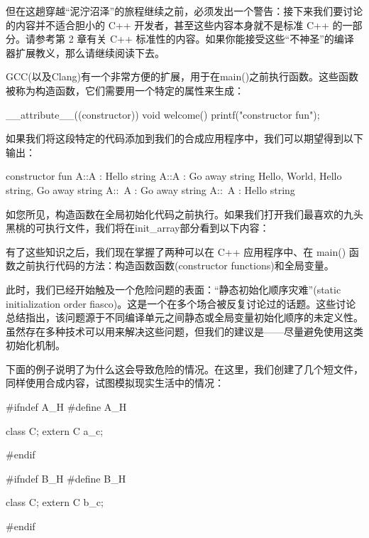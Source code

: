 但在这趟穿越“泥泞沼泽”的旅程继续之前，必须发出一个警告：接下来我们要讨论的内容并不适合胆小的 C++ 开发者，甚至这些内容本身就不是标准 C++ 的一部分。请参考第 2 章有关 C++ 标准性的内容。如果你能接受这些“不神圣”的编译器扩展教义，那么请继续阅读下去。

GCC(以及Clang)有一个非常方便的扩展，用于在main()之前执行函数。这些函数被称为构造函数，它们需要用一个特定的属性来生成：

\begin{cpp}
__attribute__((constructor)) void welcome() {
printf("constructor fun\n");
}
\end{cpp}

如果我们将这段特定的代码添加到我们的合成应用程序中，我们可以期望得到以下输出：

\begin{shell}
constructor fun
A::A : Hello string
A::A : Go away string
Hello, World, Hello string, Go away string
A::~A : Go away string
A::~A : Hello string
\end{shell}

如您所见，构造函数在全局初始化代码之前执行。如果我们打开我们最喜欢的九头黑桃的可执行文件，我们将在init\_array部分看到以下内容：


有了这些知识之后，我们现在掌握了两种可以在 C++ 应用程序中、在 main() 函数之前执行代码的方法：构造函数函数(constructor functions)和全局变量。

此时，我们已经开始触及一个危险问题的表面：“静态初始化顺序灾难”(static initialization order fiasco)。这是一个在多个场合被反复讨论过的话题。这些讨论总结指出，该问题源于不同编译单元之间静态或全局变量初始化顺序的未定义性。虽然存在多种技术可以用来解决这些问题，但我们的建议是——尽量避免使用这类初始化机制。

下面的例子说明了为什么这会导致危险的情况。在这里，我们创建了几个短文件，同样使用合成内容，试图模拟现实生活中的情况：


\begin{cpp}
#ifndef A_H
#define A_H

class C;
extern C a_c;

#endif
\end{cpp}


\begin{cpp}
#ifndef B_H
#define B_H

class C;
extern C b_c;

#endif
\end{cpp}

